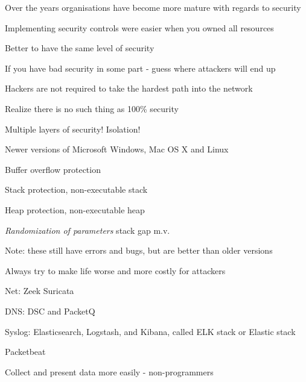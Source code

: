 \documentclass[20pt,landscape,a4paper,footrule]{foils}
\begin{document}
Over the years organisations have become more mature with regards to security

Implementing security controls were easier when you owned all resources



\begin{list1}
\item Better to have the same level of security
\item If you have bad security in some part - guess where attackers will end up
\item Hackers are not required to take the hardest path into the network
\item Realize there is no such thing as 100\% security
\end{list1}




\centerline{\hlkbig\color{security6blue} Multiple layers of security! Isolation!}



\begin{list1}
\item Newer versions of Microsoft Windows, Mac OS X and Linux
\begin{list2}
\item Buffer overflow protection
\item Stack protection, non-executable stack
\item Heap protection, non-executable heap
\item \emph{Randomization of parameters} stack gap m.v.
\end{list2}
\item Note: these still have errors and bugs, but are better than older versions

\end{list1}

\vskip 1cm

\centerline{Always try to make life worse and more costly for attackers}


\begin{list1}
\item Net: Zeek  Suricata 
\item DNS: DSC and PacketQ 
\item Syslog: Elasticsearch, Logstash, and Kibana, called ELK stack or Elastic stack
\item Packetbeat 
\end{list1}
\centerline{Collect and present data more easily - non-programmers}
\end{document}
